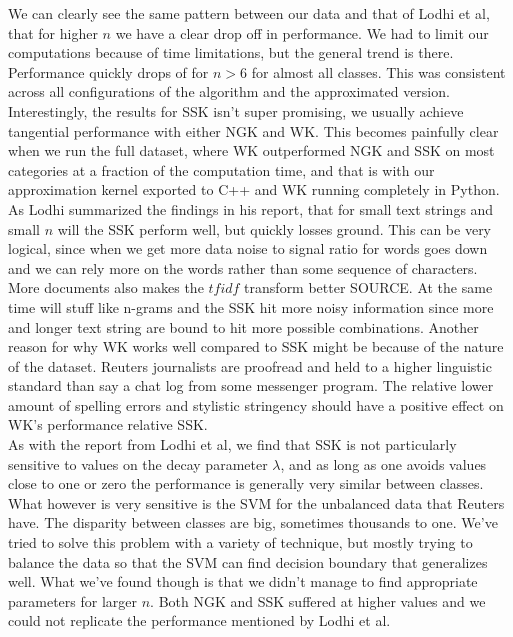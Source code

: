 We can clearly see the same pattern between our data and that of Lodhi et al, that for higher $ n $ we have a clear drop off in performance. We had to limit our computations because of time limitations, but the general trend is there. Performance quickly drops of for $ n>6 $ for almost all classes. This was consistent across all configurations of the algorithm and the approximated version. Interestingly, the results for SSK isn't super promising, we usually achieve tangential performance with either NGK and WK. This becomes painfully clear when we run the full dataset, where WK outperformed NGK and SSK on most categories at a fraction of the computation time, and that is with our approximation kernel exported to C++ and WK running completely in Python. As Lodhi summarized the findings in his report, that for small text strings and small $ n $ will the SSK perform well, but quickly losses ground. This can be very logical, since when we get more data noise to signal ratio for words goes down and we can rely more on the words rather than some sequence of characters. More documents also makes the $ tfidf $ transform better SOURCE. At the same time will stuff like n-grams and the SSK hit more noisy information since more and longer text string are bound to hit more possible combinations. Another reason for why WK works well compared to SSK might be because of the nature of the dataset. Reuters journalists are proofread and held to a higher linguistic standard than say a chat log from some messenger program. The relative lower amount of spelling errors and stylistic stringency should have a positive effect on WK's performance relative SSK.
\\
As with the report from Lodhi et al, we find that SSK is not particularly sensitive to values on the decay parameter $ \lambda $, and as long as one avoids values close to one or zero the performance is generally very similar between classes. What however is very sensitive is the SVM for the unbalanced data that Reuters have. The disparity between classes are big, sometimes thousands to one. We've tried to solve this problem with a variety of technique, but mostly trying to balance the data so that the SVM can find decision boundary that generalizes well. What we've found though is that we didn't manage to find appropriate parameters for larger $ n $. Both NGK and SSK suffered at higher values and we could not replicate the performance mentioned by Lodhi et al.  
\\
